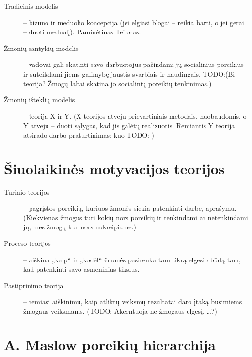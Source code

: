 \begin{description}
  \item[Tradicinis modelis] – bizūno ir meduolio koncepcija (jei elgiasi
    blogai – reikia barti, o jei gerai – duoti meduolį). Paminėtinas
    Teiloras.
  \item[Žmonių santykių modelis] – vadovai gali skatinti savo darbuotojus
    pažindami jų socialinius poreikius ir suteikdami jiems galimybę
    jaustis svarbiais ir naudingais. TODO:(Bi~ teorija? Žmogų labai skatina
    jo socialinių poreikių tenkinimas.)
  \item[Žmonių išteklių modelis] – teorija X ir Y. (X teorijos atveju
    prievartiniais metodais, nuobaudomis, o Y atveju – duoti sąlygas,
    kad jis galėtų realizuotis. Remiantis Y teorija atsirado darbo
    praturtinimas: kuo TODO: )
\end{description}

\section{Šiuolaikinės motyvacijos teorijos}

\begin{description}
  \item[Turinio teorijos] – pagrįstos poreikių, kuriuos žmonės siekia 
    patenkinti darbe, aprašymu. (Kiekvienas žmogus turi kokių nors
    poreikių ir tenkindami ar netenkindami jų, mes žmogų kur nors
    nukreipiame.)
  \item[Proceso teorijos] – aiškina „kaip“ ir „kodėl“ žmonės pasirenka
    tam tikrą elgesio būdą tam, kad patenkinti savo asmeninius tikslus.
  \item[Pastiprinimo teorija] – remiasi aiškinimu, kaip atliktų
    veiksmų rezultatai daro įtaką būsimiems žmogaus veiksmams. (TODO:
    Akcentuoja ne žmogaus elgesį, …?)
\end{description}

\section{A. Maslow poreikių hierarchija}

